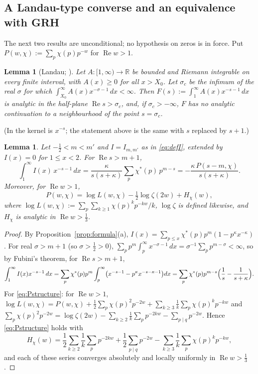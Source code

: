 \documentclass[11pt]{amsart}
\newtheorem{lemma}[theorem]{Lemma}
\theoremstyle{definition}
\numberwithin{equation}{section}
\newcommand{\re}{\operatorname{Re}}
\begin{document}
\subsection{A Landau-type converse and an equivalence with GRH}

The next two results are unconditional; no hypothesis on zeros is in
force. Put $P(w,\chi):=\sum_p\chi(p)p^{-w}$ for $\re w>1$.

\begin{lemma}[Landau; {\cite[Lemma~15.1]{MV07}}]\label{lem:landau}
Let $A:[1,\infty)\to\mathbb R$ be bounded and Riemann integrable on
every finite interval, with $A(x)\ge0$ for all $x>X_0$. Let
$\sigma_c$ be the infimum of the real $\sigma$ for which
$\int_{X_0}^\infty A(x)x^{-\sigma-1}\,dx<\infty$. Then
$F(s):=\int_1^\infty A(x)x^{-s-1}\,dx$ is analytic in the half-plane
$\re s>\sigma_c$, and, if $\sigma_c>-\infty$, $F$ has no analytic
continuation to a neighbourhood of the point $s=\sigma_c$.
\end{lemma}

(In \cite{MV07} the kernel is $x^{-s}$; the statement above is the
same with $s$ replaced by $s+1$.)

\begin{lemma}\label{lem:mellin}
Let $-\tfrac12<m<m'$ and $I=I_{m,m'}$ as in \eqref{eq:defI}, extended
by $I(x)=0$ for $1\le x<2$. For $\re s>m+1$,
\[
\int_1^\infty I(x)\,x^{-s-1}\,dx
=\frac{\kappa}{s(s+\kappa)}\sum_p\chi^*(p)\,p^{m-s}
=-\frac{\kappa\,P(s-m,\chi)}{s(s+\kappa)} .
\]
Moreover, for $\re w>1$,
\begin{equation}\label{eq:Pstructure}
P(w,\chi)=\log L(w,\chi)-\tfrac12\log\zeta(2w)+H_\chi(w),
\end{equation}
where $\log L(w,\chi):=\sum_p\sum_{k\ge1}\chi(p)^kp^{-kw}/k$,
$\log\zeta$ is defined likewise, and $H_\chi$ is analytic in
$\re w>\tfrac13$.
\end{lemma}

\begin{proof}
By Proposition~\ref{prop:formula}(a),
$I(x)=\sum_{p\le x}\chi^*(p)p^m(1-p^\kappa x^{-\kappa})$. For real
$\sigma>m+1$ (so $\sigma>\tfrac12>0$),
$\sum_pp^m\int_p^\infty x^{-\sigma-1}\,dx=\sigma^{-1}\sum_pp^{m-\sigma}
<\infty$, so by Fubini's theorem, for $\re s>m+1$,
\[
\int_1^\infty I(x)x^{-s-1}\,dx
=\sum_p\chi^*(p)p^m\int_p^\infty\bigl(x^{-s-1}-p^\kappa x^{-s-\kappa-1}\bigr)dx
=\sum_p\chi^*(p)p^{m-s}\Bigl(\frac1s-\frac1{s+\kappa}\Bigr).
\]
For \eqref{eq:Pstructure}: for $\re w>1$,
$\log L(w,\chi)=P(w,\chi)+\tfrac12\sum_p\chi(p)^2p^{-2w}
+\sum_{k\ge3}\frac1k\sum_p\chi(p)^kp^{-kw}$ and
$\sum_p\chi(p)^2p^{-2w}=\log\zeta(2w)-\sum_{k\ge2}\frac1k\sum_pp^{-2kw}
-\sum_{p\mid q}p^{-2w}$. Hence \eqref{eq:Pstructure} holds with
\[
H_\chi(w)=\frac12\sum_{k\ge2}\frac1k\sum_pp^{-2kw}
+\frac12\sum_{p\mid q}p^{-2w}
-\sum_{k\ge3}\frac1k\sum_p\chi(p)^kp^{-kw},
\]
and each of these series converges absolutely and locally uniformly
in $\re w>\tfrac13$.
\end{proof}
\end{document}
